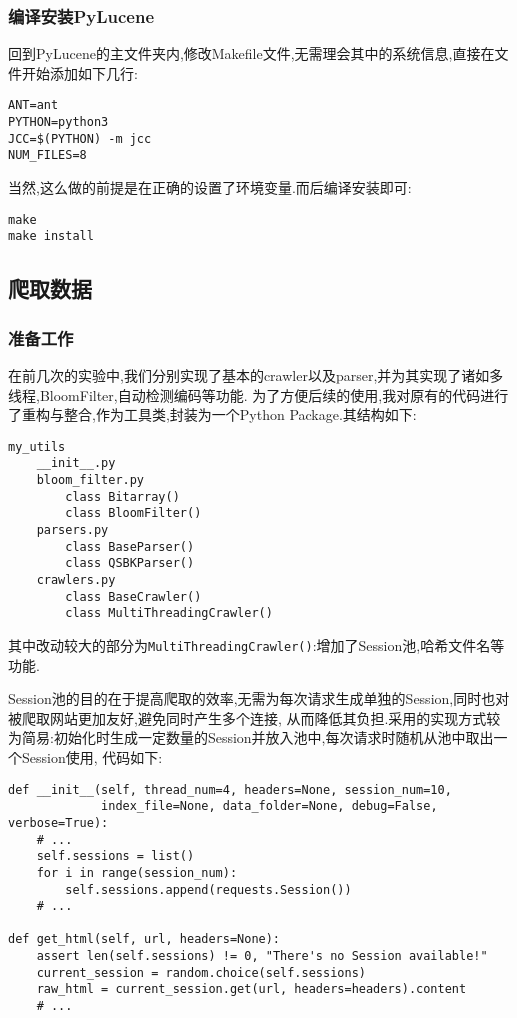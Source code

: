 \documentclass[a4paper]{article}
\begin{document}
        \subsubsection{编译安装PyLucene}
回到PyLucene的主文件夹内,修改Makefile文件,无需理会其中的系统信息,直接在文件开始添加如下几行:
\begin{verbatim}
ANT=ant
PYTHON=python3
JCC=$(PYTHON) -m jcc
NUM_FILES=8
\end{verbatim}

当然,这么做的前提是在正确的设置了环境变量.而后编译安装即可:
\begin{verbatim}
make
make install
\end{verbatim}
        \subsection{爬取数据}
            \subsubsection{准备工作}
在前几次的实验中,我们分别实现了基本的crawler以及parser,并为其实现了诸如多线程,BloomFilter,自动检测编码等功能.
为了方便后续的使用,我对原有的代码进行了重构与整合,作为工具类,封装为一个Python Package.其结构如下:
\begin{verbatim}
my_utils
    __init__.py
    bloom_filter.py
        class Bitarray()
        class BloomFilter()
    parsers.py
        class BaseParser()
        class QSBKParser()
    crawlers.py
        class BaseCrawler()
        class MultiThreadingCrawler()
\end{verbatim}

其中改动较大的部分为\texttt{MultiThreadingCrawler()}:增加了Session池,哈希文件名等功能.

Session池的目的在于提高爬取的效率,无需为每次请求生成单独的Session,同时也对被爬取网站更加友好,避免同时产生多个连接,
从而降低其负担.采用的实现方式较为简易:初始化时生成一定数量的Session并放入池中,每次请求时随机从池中取出一个Session使用,
代码如下:
\begin{verbatim}
def __init__(self, thread_num=4, headers=None, session_num=10,
             index_file=None, data_folder=None, debug=False, verbose=True):
    # ...
    self.sessions = list()
    for i in range(session_num):
        self.sessions.append(requests.Session())
    # ...

def get_html(self, url, headers=None):
    assert len(self.sessions) != 0, "There's no Session available!"
    current_session = random.choice(self.sessions)
    raw_html = current_session.get(url, headers=headers).content
    # ...
\end{verbatim}
\end{document}
